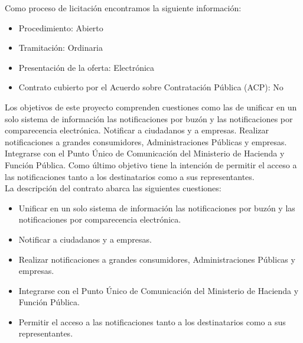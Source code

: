Como proceso de licitación encontramos la siguiente información:

\begin{itemize}
	\item Procedimiento: Abierto
	\item Tramitación: Ordinaria
	\item Presentación de la oferta: Electrónica
	\item Contrato cubierto por el Acuerdo sobre Contratación Pública (ACP): No
\end{itemize}

Los objetivos \cite{misc:caracteristicas} de este proyecto comprenden cuestiones como las de unificar en un solo sistema de información las notificaciones por buzón y las notificaciones por comparecencia electrónica. Notificar a ciudadanos y a empresas. Realizar notificaciones a grandes consumidores, Administraciones Públicas y empresas. Integrarse con el Punto Único de Comunicación del Ministerio de Hacienda y Función Pública. Como último objetivo tiene la intención de permitir el acceso a las notificaciones tanto a los destinatarios como a sus representantes. \\

La descripción del contrato abarca las siguientes cuestiones:

\begin{itemize}
	\item Unificar en un solo sistema de información las notificaciones por buzón y las notificaciones por comparecencia electrónica.
	\item Notificar a ciudadanos y a empresas. 
	\item Realizar notificaciones a grandes consumidores, Administraciones Públicas y empresas. 
	\item Integrarse con el Punto Único de Comunicación del Ministerio de Hacienda y Función Pública.
	\item Permitir el acceso a las notificaciones tanto a los destinatarios como a sus representantes.	
\end{itemize}







